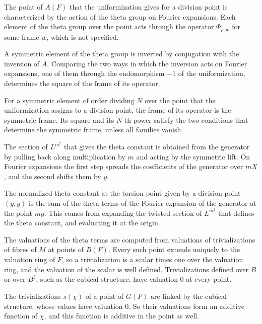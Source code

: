 The point of $A(F)$ that the uniformization gives for a division point is characterized by the action of the
theta group on Fourier expansions. Each element of the theta group over the point acts through the operator
$\Phi_{p,w}$ for some frame $w$, which is not specified.

A symmetric element of the theta group is inverted by conjugation with the inversion of $A$. Comparing the two
ways in which the inversion acts on Fourier expansions, one of them through the endomorphism $-1$ of the
uniformization, determines the square of the frame of its operator.

For a symmetric element of order dividing $N$ over the point that the uniformization assigns to a division point,
the frame of its operator is the symmetric frame. Its square and its $N$-th power satisfy the two conditions that
determine the symmetric frame, unless all families vanish.

The section of $L^{m^2}$ that gives the theta constant is obtained from the generator by pulling back along
multiplication by $m$ and acting by the symmetric lift. On Fourier expansions the first step spreads the
coefficients of the generator over $mX$, and the second shifts them by $y$.

The normalized theta constant at the torsion point given by a division point $(y,g)$ is the sum of the theta
terms of the Fourier expansion of the generator at the point $mg$. This comes from expanding the twisted
section of $L^{m^2}$ that defines the theta constant, and evaluating it at the origin.

The valuations of the theta terms are computed from valuations of trivializations of fibres of $M$ at
points of $B(F)$. Every such point extends uniquely to the valuation ring of $F$, so a trivialization is a
scalar times one over the valuation ring, and the valuation of the scalar is well defined. Trivializations
defined over $B$ or over $B^3$, such as the cubical structure, have valuation $0$ at every point.

The trivializations $s(\chi)$ of a point of $\tilde G(F)$ are linked by the cubical structure, whose values
have valuation $0$. So their valuations form an additive function of $\chi$, and this function is additive
in the point as well.

